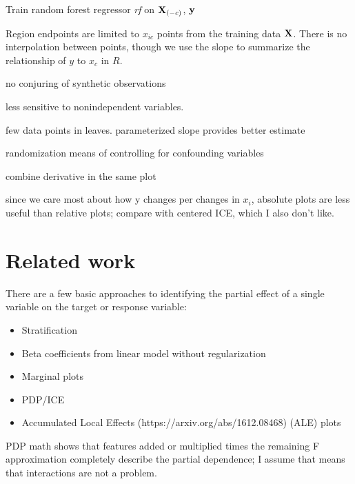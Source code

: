 \documentclass[12pt]{article}
\begin{document}
\setlength{\algomargin}{5pt}
\begin{algorithm}[H]
\label{alg:CatStratPD}
\LinesNumbered
{}
\SetAlgoSkip{}
\SetInd{.5em}{.5em}
Train random forest regressor {\it rf} on ${\bf X}_{(-c)}$, $\bf y$\\
\end{algorithm}




Region endpoints are limited to $x_{ic}$ points from the training data $\bf X$.  There is no interpolation between points, though we use the slope to summarize the relationship of $y$ to $x_c$ in $R$.

no conjuring of synthetic observations

less sensitive to nonindependent variables.
 
few data points in leaves. parameterized slope provides better estimate

randomization means of controlling for confounding variables

combine derivative in the same plot

since we care most about how y changes per changes in $x_i$, absolute plots are less useful than relative plots; compare with centered ICE, which I also don't like.

\section{Related work}

There are a few basic approaches to identifying the partial effect of a single variable on the target or response variable:

\begin{itemize}
\item Stratification
\item Beta coefficients from linear model without regularization
\item Marginal plots
\item PDP/ICE
\item Accumulated Local Effects (https://arxiv.org/abs/1612.08468) (ALE) plots
\end{itemize}

PDP math shows that features added or multiplied times the remaining F approximation completely describe the partial dependence; I assume that means that interactions are not a problem.
\end{document}
